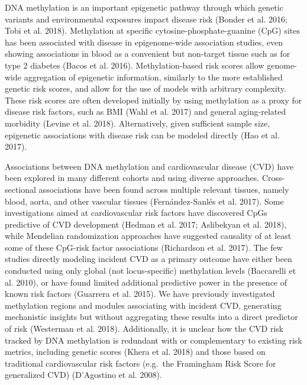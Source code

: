 \documentclass[]{article}
\begin{document}
DNA methylation is an important epigenetic pathway through which genetic
variants and environmental exposures impact disease risk (Bonder et al.
2016; Tobi et al. 2018). Methylation at specific
cytosine-phosphate-guanine (CpG) sites has been associated with disease
in epigenome-wide association studies, even showing associations in
blood as a convenient but non-target tissue such as for type 2 diabetes
(Bacos et al. 2016). Methylation-based risk scores allow genome-wide
aggregation of epigenetic information, similarly to the more established
genetic risk scores, and allow for the use of models with arbitrary
complexity. These risk scores are often developed initially by using
methylation as a proxy for disease risk factors, such as BMI (Wahl et
al. 2017) and general aging-related morbidity (Levine et al. 2018).
Alternatively, given sufficient sample size, epigenetic associations
with disease risk can be modeled directly (Hao et al. 2017).

Associations between DNA methylation and cardiovascular disease (CVD)
have been explored in many different cohorts and using diverse
approaches. Cross-sectional associations have been found across multiple
relevant tissues, namely blood, aorta, and other vascular tissues
(Fernández-Sanlés et al. 2017). Some investigations aimed at
cardiovascular risk factors have discovered CpGs predictive of CVD
development (Hedman et al. 2017; Aslibekyan et al. 2018), while
Mendelian randomization approaches have suggested causality of at least
some of these CpG-risk factor associations (Richardson et al. 2017). The
few studies directly modeling incident CVD as a primary outcome have
either been conducted using only global (not locus-specific) methylation
levels (Baccarelli et al. 2010), or have found limited additional
predictive power in the presence of known risk factors (Guarrera et al.
2015). We have previously investigated methylation regions and modules
associating with incident CVD, generating mechanistic insights but
without aggregating these results into a direct predictor of risk
(Westerman et al. 2018). Additionally, it is unclear how the CVD risk
tracked by DNA methylation is redundant with or complementary to
existing risk metrics, including genetic scores (Khera et al. 2018) and
those based on traditional cardiovascular risk factors (e.g.~the
Framingham Risk Score for generalized CVD) (D'Agostino et al. 2008).
\end{document}
